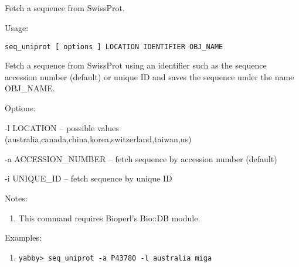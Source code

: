 

\subsection[seq\_uniprot]{  }



Fetch a sequence from SwissProt.


\begin{description}


\item{Usage:}

{\tt seq\_uniprot [ options ] LOCATION IDENTIFIER OBJ\_NAME}

 Fetch a sequence from SwissProt using an identifier such as the
 sequence accession number (default) or
 unique ID and saves the sequence under the name OBJ\_NAME.


\item{Options:}
\begin{description}
\item -l LOCATION -- possible values (australia,canada,china,korea,switzerland,taiwan,us)
\item -a ACCESSION\_NUMBER -- fetch sequence by accession number (default)
\item -i UNIQUE\_ID -- fetch sequence by unique ID

\end{description}


\item{Notes:}
\begin{enumerate}
\item This command requires Bioperl's Bio::DB module.
\end{enumerate}


\item{Examples:}
\begin{enumerate}

\item
\begin{verbatim}
yabby> seq_uniprot -a P43780 -l australia miga


\end{verbatim}
\end{enumerate}
\end{description}
